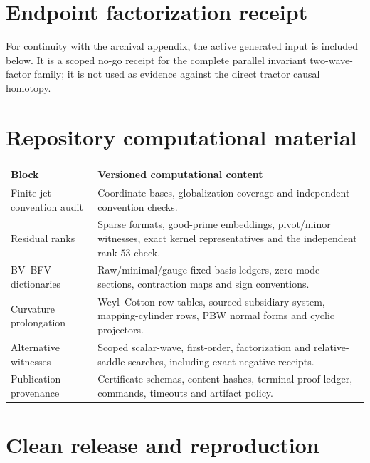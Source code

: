 \documentclass[11pt]{article}
\begin{document}
\section{Endpoint factorization receipt}

For continuity with the archival appendix, the active generated input is
included below.  It is a scoped no-go receipt for the complete parallel
invariant two-wave-factor family; it is not used as evidence against the
direct tractor causal homotopy.



\section{Repository computational material}

\begin{longtable}{>{\raggedright\arraybackslash}p{}
                  >{\raggedright\arraybackslash}p{}}
\toprule
Block & Versioned computational content \\
\midrule
\endhead
Finite-jet convention audit & Coordinate bases, globalization coverage and
independent convention checks. \\
Residual ranks & Sparse formats, good-prime embeddings, pivot/minor witnesses,
exact kernel representatives and the independent rank-$53$ check. \\
BV--BFV dictionaries & Raw/minimal/gauge-fixed basis ledgers, zero-mode
sections, contraction maps and sign conventions. \\
Curvature prolongation & Weyl--Cotton row tables, sourced subsidiary system,
mapping-cylinder rows, PBW normal forms and cyclic projectors. \\
Alternative witnesses & Scoped scalar-wave, first-order, factorization and
relative-saddle searches, including exact negative receipts. \\
Publication provenance & Certificate schemas, content hashes, terminal proof
ledger, commands, timeouts and artifact policy. \\
\bottomrule
\end{longtable}

\section{Clean release and reproduction}
\end{document}
